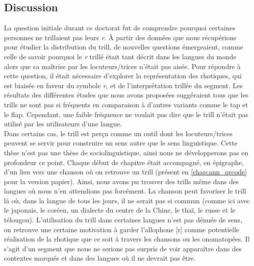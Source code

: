 \subsection*{Discussion}

La question initiale durant ce doctorat fut de comprendre pourquoi certaines personnes ne trillaient pas leurs \textit{r}. À partir des données que nous récupérions pour étudier la distribution du trill, de nouvelles questions émergeaient, comme celle de savoir pourquoi le \textit{r} trillé était tant décrit dans les langues du monde alors que sa maîtrise par les locuteurs/trices n'était pas aisée.
Pour répondre à cette question, il était nécessaire d'explorer la représentation des rhotiques, qui est biaisée en faveur du symbole \textit{r}, et de l'interprétation trillée du segment. Les résultats des différentes études que nous avons proposées suggéraient tous que les trills ne sont pas si fréquents en comparaison à d'autres variants comme le tap et le flap. Cependant, une faible fréquence ne voulait pas dire que le trill n'était pas utilisé par les utilisateurs d'une langue.\\

Dans certains cas, le trill est perçu comme un outil dont les locuteurs/trices peuvent se servir pour construire un sens autre que le sens linguistique. Cette thèse n'est pas une thèse de sociolinguistique, ainsi nous ne développerons pas en profondeur ce point. Chaque début de chapitre était accompagné, en épigraphe, d'un lien vers une chanson où on retrouve un trill (présent en \autoref{chap:ann_qrcode} pour la version papier).
Ainsi, nous avons pu trouver des trills même dans des langues où nous n'en attendions pas forcément.
La chanson peut favoriser le trill là où, dans la langue de tous les jours, il ne serait pas si commun (comme ici avec le japonais, le coréen, un dialecte du centre de la Chine, le thaï, le russe et le télougou). L'utilisation du trill dans certaines langues n'est pas dénuée de sens, on retrouve une certaine motivation à garder l'allophone [r] comme potentielle réalisation de la rhotique que ce soit à travers les chansons ou les onomatopées. Il s'agit d'un segment  que nous ne serions pas surpris de voir apparaître dans des contextes marqués et dans des langues où il ne devrait pas être. \\

